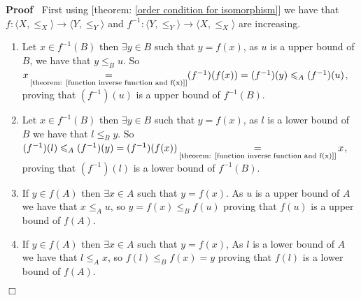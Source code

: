 \documentclass{book}
\newcommand{\equallim}{\mathop{=}\limits}
\newenvironment{proof}{\noindent\textbf{Proof\ }}{\hspace*{\fill}$\Box$\medskip}
\begin{document}
\begin{proof}
  First using [theorem: \ref{order condition for isomorphism}] we have that $f
  : \langle X, \leqslant_X \rangle \rightarrow \langle Y, \leqslant_Y \rangle$
  and $f^{- 1} : \langle Y, \leqslant_Y \rangle \rightarrow \langle X,
  \leqslant_X \rangle$ are increasing.
  \begin{enumerate}
    \item Let $x \in f^{- 1} (B)$ then $\exists y \in B$ such that $y = f
    (x)$, as $u$ is a upper bound of $B$, we have that $y \leqslant_B u$. So
    $x \equallim_{\text{[theorem: \ref{function inverse function and f(x)}]}}
    (f^{- 1}) (f (x)) = (f^{- 1}) (y) \leqslant_A (f^{- 1}) (u)$, proving that
    $(f^{- 1}) (u)$ is a upper bound of $f^{- 1} (B)$.
    
    \item Let $x \in f^{- 1} (B)$ then $\exists y \in B$ such that $y = f
    (x)$, as $l$ is a lower bound of $B$ we have that $l \leqslant_B y$. So
    $(f^{- 1}) (l) \leqslant_A (f^{- 1}) (y) = (f^{- 1}) (f (x))
    \equallim_{\text{[theorem: \ref{function inverse function and f(x)}]}} x$,
    proving that $(f^{- 1}) (l)$ is a lower bound of $f^{- 1} (B)$.
    
    \item If $y \in f (A)$ then $\exists x \in A$ such that $y = f (x)$. As
    $u$ is a upper bound of $A$ we have that $x \leqslant_A u$, so $y = f (x)
    \leqslant_B f (u)$ proving that $f (u)$ is a upper bound of $f (A)$.
    
    \item If $y \in f (A)$ then $\exists x \in A$ such that $y = f (x)$, As
    $l$ is a lower bound of $A$ we have that $l \leqslant_A x$, so $f (l)
    \leqslant_B f (x) = y$ proving that $f (l)$ is a lower bound of $f (A)$.
    

\end{enumerate}
\end{proof}
\end{document}
